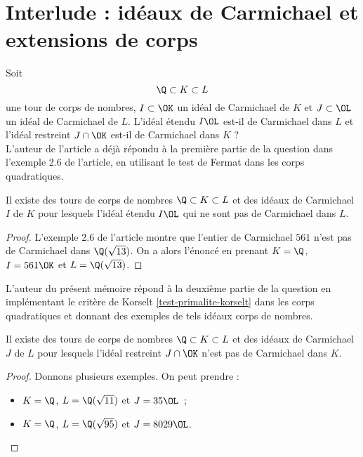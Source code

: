 \section{Interlude : idéaux de Carmichael et extensions de corps}

Soit \[\Q\subset K \subset L\] une tour de corps de nombres, $I\subset \OK$ un idéal de Carmichael de $K$ et $J \subset \OL$ un idéal de Carmichael de $L$. L'idéal étendu $I\OL$ est-il de Carmichael dans $L$ et l'idéal restreint $J\cap\OK$ est-il de Carmichael dans $K$ ? \\

L'auteur de l'article a déjà répondu à la première partie de la question dans l'exemple 2.6 de l'article, en utilisant le test de Fermat dans les corps quadratiques.

\begin{proposition}\label{premier-ce}
	Il existe des tours de corps de nombres $\Q\subset K \subset L$ et des idéaux de Carmichael $I$ de $K$ pour lesquels l'idéal étendu $I\OL$ qui ne sont pas de Carmichael dans $L$.
\end{proposition}

\begin{proof}
	L'exemple 2.6 de l'article montre que l'entier de Carmichael $561$ n'est pas de Carmichael dans $\Q(\sqrt{13})$. On a alors l'énoncé en prenant $K = \Q$, $I = 561\OK$ et $L = \Q(\sqrt{13})$.
\end{proof}

L'auteur du présent mémoire répond à la deuxième partie de la question en implémentant le critère de Korselt \ref{test-primalite-korselt} dans les corps quadratiques et donnant des exemples de tels idéaux corps de nombres.

\begin{proposition}\label{deuxieme-ce}
	Il existe des tours de corps de nombres $\Q\subset K \subset L$ et des idéaux de Carmichael $J$ de $L$ pour lesquels l'idéal restreint $J\cap \OK$ n'est pas de Carmichael dans $K$.
\end{proposition}

\begin{proof}
Donnons plusieurs exemples. On peut prendre :
\begin{itemize}
	\item $K = \Q$, $L = \Q(\sqrt{11})$ et $J = 35\OL$~;
	\item $K = \Q$, $L = \Q(\sqrt{95})$ et $J = 8029\OL$.
\end{itemize}
\end{proof}

